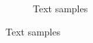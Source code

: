 \documentclass{article}
\begin{document}
\begin{enumerate}[(a)]
\begin{figure}[H]
\begin{subfigure}{0.65\textwidth}
        \caption{Text samples}
    \end{subfigure}
\end{figure}

\end{enumerate}

\newpage
{}
\end{document}
